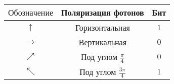 \begin{tabular}{| c | c | c |}
    \hline
    $ Обозначение $ & Поляризация фотонов        & Бит \\
    \hline
    $\uparrow$      & Горизонтальная             & $1$  \\
    \hline  
    $\rightarrow$   & Вертикальная               & $0$  \\
    \hline  
    $\nearrow$      & Под углом $\frac{\pi}{4}$    & $0$  \\
    \hline  
    $\nwarrow$      & Под углом $\frac{3\pi}{4}$   & $1$   \\
    \hline  

    \end{tabular}